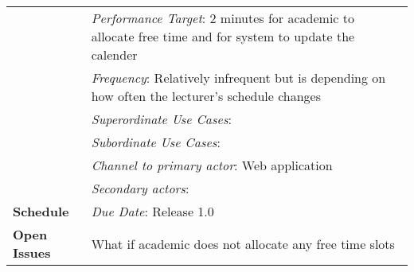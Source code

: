 \documentclass[11pt, a4paper]{article}
\begin{document}
\begin{table}[t]
\begin{tabular}{| p{45mm} | p{10cm} |}
				& \textit{Performance Target}: 2 minutes for academic to allocate free time and for system to update the calender\\
				& \textit{Frequency}: Relatively infrequent but is depending on how often the lecturer's schedule changes \\
				& \textit{Superordinate Use Cases}: \\
				& \textit{Subordinate Use Cases}: \\
				& \textit{Channel to primary actor}: Web application \\
				& \textit{Secondary actors}: \\
				\hline
				\textbf{Schedule} 	& \textit{Due Date}: Release 1.0 \\
				\hline 
				\textbf{Open Issues} & What if academic does not allocate any free time slots\\
				\hline
				
				\end{tabular}
				\end{table}
	
\end{document}
